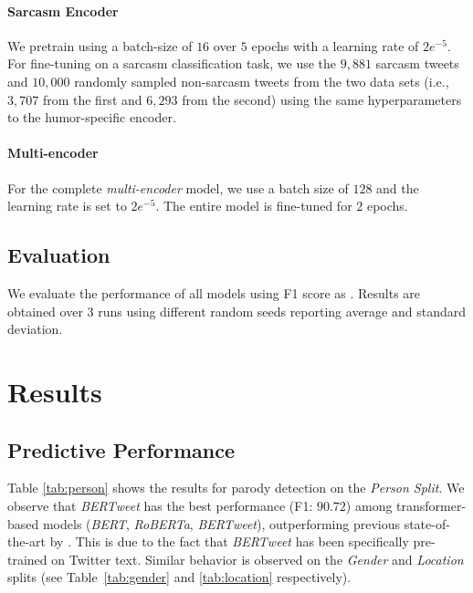 \documentclass[11pt]{article}
\begin{document}
\paragraph{Sarcasm Encoder} 
We pretrain using a batch-size of $16$ over $5$ epochs with a learning rate of $2e^{-5}$. For fine-tuning on a sarcasm classification task, we use the $9,881$ sarcasm tweets and $10,000$ randomly sampled non-sarcasm tweets from the two data sets (i.e., $3,707$ from the first and $6,293$ from the second) using the same hyperparameters to the humor-specific encoder.

\paragraph{Multi-encoder}
For the complete \emph{multi-encoder} model, we use a batch size of $128$ and the learning rate is set to $2e^{-5}$. The entire model is fine-tuned for $2$ epochs.%

\subsection{Evaluation} 
We evaluate the performance of all models using F1 score as \citet{maronikolakis-etal-2020-analyzing}. Results are obtained over $3$ runs using different random seeds reporting average and standard deviation. 


\section{Results}
\label{sec:results}

\subsection{Predictive Performance}
Table \ref{tab:person} shows the results for parody detection on the \emph{Person Split}. %
We observe that \textit{BERTweet} has the best performance (F1: $90.72$) among transformer-based models (\textit{BERT}, \textit{RoBERTa}, \textit{BERTweet}), outperforming previous state-of-the-art by \citet{maronikolakis-etal-2020-analyzing}. This is due to the fact that \textit{BERTweet} has been specifically pre-trained on Twitter text. Similar behavior is observed on the \emph{Gender} and \emph{Location} splits (see Table~\ref{tab:gender} and \ref{tab:location} respectively). %
\end{document}
